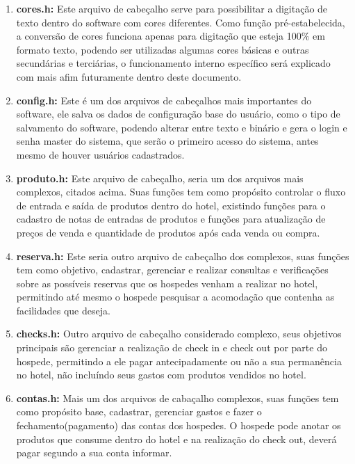 \documentclass{article}
\begin{document}
\begin{enumerate}
  		\item \textbf{cores.h:} Este arquivo de cabeçalho serve para possibilitar a digitação de texto dentro do software com cores diferentes. Como função pré-estabelecida, a conversão de cores funciona apenas para digitação que esteja 100$\%$ em formato texto, podendo ser utilizadas algumas cores básicas e outras secundárias e terciárias, o funcionamento interno específico será explicado com mais afim futuramente dentro deste documento.\\
  		\item \textbf{config.h:} Este é um dos arquivos de cabeçalhos mais importantes do software, ele salva os dados de configuração base do usuário, como o tipo de salvamento do software, podendo alterar entre texto e binário e gera o login e senha master do sistema, que serão o primeiro acesso do sistema, antes mesmo de houver usuários cadastrados.\\
  		\item \textbf{produto.h:} Este arquivo de cabeçalho, seria um dos arquivos mais complexos, citados acima. Suas funções tem como propósito controlar o fluxo de entrada e saída de produtos dentro do hotel, existindo funções para o cadastro de notas de entradas de produtos e funções para atualização de preços de venda e quantidade de produtos após cada venda ou compra.\\
  		\item \textbf{reserva.h:} Este seria outro arquivo de cabeçalho dos complexos, suas funções tem como objetivo, cadastrar, gerenciar e realizar consultas e verificações sobre as possíveis reservas que os hospedes venham a realizar no hotel, permitindo até mesmo o hospede pesquisar a acomodação que contenha as facilidades que deseja.\\
  		\item \textbf{checks.h:} Outro arquivo de cabeçalho considerado complexo, seus objetivos principais são gerenciar a realização de check in e check out por parte do hospede, permitindo a ele pagar antecipadamente ou não a sua permanência no hotel, não incluíndo seus gastos com produtos vendidos no hotel.\\
  		\item \textbf{contas.h:} Mais um dos arquivos de cabaçalho complexos, suas funções tem como propósito base, cadastrar, gerenciar gastos e fazer o fechamento(pagamento) das contas dos hospedes. O hospede pode anotar os produtos que consume dentro do hotel e na realização do check out, deverá pagar segundo a sua conta informar.\\

\end{enumerate}
\end{document}
